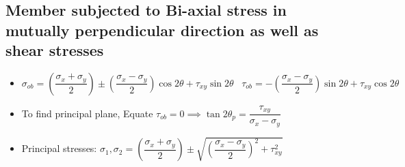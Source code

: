 \documentclass[8pt]{report}
\begin{document}
	\subsection{Member subjected to Bi-axial stress in mutually perpendicular direction as well as shear stresses}
		\begin{itemize}
			\item $\boxed{\sigma_{ob} = \left(\dfrac{\sigma_x+\sigma_y}{2}\right)\pm \left(\dfrac{\sigma_x-\sigma_y}{2}\right)\cos 2\theta+\tau_{xy}\sin 2\theta}\;\;\;\boxed{\tau_{ob} = -\left(\dfrac{\sigma_x-\sigma_y}{2}\right)\sin 2\theta+\tau_{xy}\cos 2\theta}$
			\item To find principal plane, Equate $\tau_{ob} = 0 \implies \boxed{\tan 2\theta_p = \dfrac{\tau_{xy}}{\sigma_x-\sigma_y}}$
			\item Principal stresses: $\boxed{\sigma_1,\sigma_2 = \left(\dfrac{\sigma_x+\sigma_y}{2}\right)\pm\sqrt{\left(\dfrac{\sigma_x-\sigma_y}{2}\right)^2+\tau_{xy}^2}}$
		\end{itemize}\hrulefill
\end{document}
